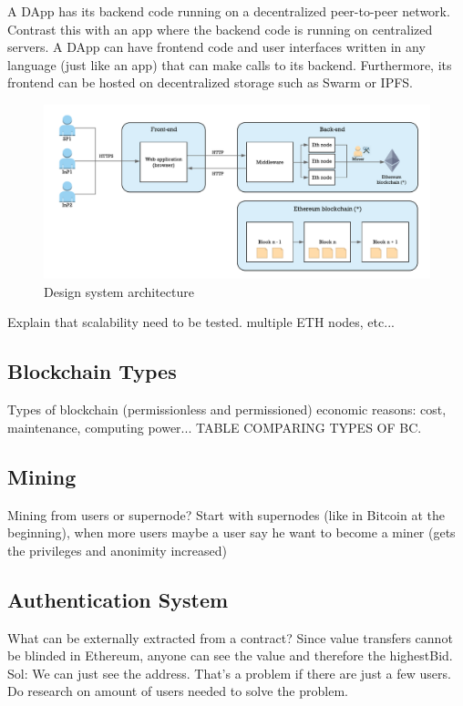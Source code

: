 A DApp has its backend code running on a decentralized peer-to-peer network. Contrast this with an app where the backend code is running on centralized servers. A DApp can have frontend code and user interfaces written in any language (just like an app) that can make calls to its backend. Furthermore, its frontend can be hosted on decentralized storage such as Swarm or IPFS.

\begin{figure}[bth]
	\centering
	\includegraphics[width=1\linewidth]{gfx/designWorkflow}    
  	\caption{Design system architecture}
  	\label{fig:designWorkflow}
\end{figure}

Explain that scalability need to be tested. multiple ETH nodes, etc...

\subsection{Blockchain Types}

Types of blockchain (permissionless and permissioned) economic reasons: cost, maintenance, computing power...  TABLE COMPARING TYPES OF BC.

\subsection{Mining}

Mining from users or supernode? Start with supernodes (like in Bitcoin at the beginning), when more users maybe a user say he want to become a miner (gets the privileges and anonimity increased)

\subsection{Authentication System}

What can be externally extracted from a contract? Since value transfers cannot be blinded in Ethereum, anyone can see the value and therefore the highestBid. Sol: We can just see the address. That's a problem if there are just a few users. Do research on amount of users needed to solve the problem.

